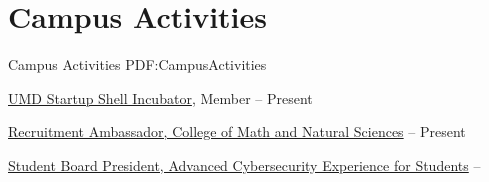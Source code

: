 
\section
{Campus Activities}
{Campus Activities}
{PDF:CampusActivities}

\BulletItem
\href{http://startupshell.org/}
{UMD Startup Shell Incubator},
Member
\hfill
{} --
Present

\GapNoBreak
\BulletItem
\href{https://cmns.umd.edu/undergraduate/admissions/recruitment-ambassadors}
{Recruitment Ambassador,
College of Math and Natural Sciences}
\hfill
{} --
Present

\GapNoBreak
\BulletItem
\href{http://aces.umd.edu/}
{Student Board President,
Advanced Cybersecurity Experience for Students}
\hfill
{} --
